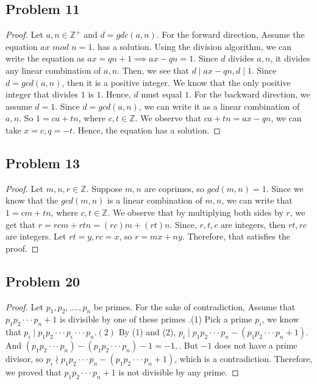 \documentclass[a4paper,12pt]{article}
\begin{document}
\subsection*{Problem 11}
\begin{proof}
Let $a,n \in \mathbb{Z^+}$ and $d=gdc(a,n).$ For the forward direction, Assume the equation $ax$ $mod$ $n=1.$ has a solution. Using the division algorithm, we can write the equation as $ax=qn+1 \implies ax-qn=1.$ Since $d$ divides $a,n$, it divides any linear combination of $a,n$. Then, we see that $d\mid ax-qn, d\mid1$. Since $d=gcd(a,n)$, then it is a positive integer. We know that the only positive integer that divides $1$ is $1$. Hence, $d$ must equal $1$. For the backward direction, we assume $d=1$. Since $d=gcd(a,n)$, we can write it as a linear combination of $a,n$. So $1=ca+tn$, where $c,t\in \mathbb{Z}.$ We observe that $ca+tn=ax-qn$, we can take $x=c, q=-t.$ Hence, the equation has a solution.    
\end{proof}
\subsection*{Problem 13}
\begin{proof}
    Let $m,n,r \in \mathbb{Z}$. Suppose $m,n$ are coprimes, so $gcd(m,n)=1$. Since we know that the $gcd(m,n)$ is a linear combination of $m,n$, we can write that $1=cm+tn$, where $c,t \in \mathbb{Z}.$ We observe that by multiplying both sides by $r$, we get that $r=rcm+rtn=(rc)m+(rt)n$.
Since, $r,t,c$ are integers, then $rt, rc$ are integers. Let $rt=y, rc=x$, so $r=mx+ny.$ Therefore, that satisfies the proof.
\end{proof}
\subsection*{Problem 20}
\begin{proof}
    Let $p_1,p_2,....,p_n$ be primes. For the sake of contradiction, Assume that $p_1p_2\cdot \cdot \cdot p_n+1$ is divisible by one of these primes .(1) Pick a prime $p_i$, we know that $p_i\mid p_1p_2\cdot \cdot \cdot p_i \cdot \cdot \cdot p_n .(2) $ By (1) and (2), $p_i\mid p_1p_2\cdot \cdot \cdot p_n-(p_1p_2\cdot \cdot \cdot p_n+1)$. And $(p_1p_2\cdot \cdot \cdot p_n)-(p_1p_2\cdot \cdot \cdot p_n)-1=-1,$. But $-1$ does not have a prime divisor, so $p_i\nmid p_1p_2\cdot \cdot \cdot p_n-(p_1p_2\cdot \cdot \cdot p_n+1)$, which is a contradiction. Therefore, we proved that $p_1p_2\cdot \cdot \cdot p_n+1$ is not divisible by any prime.
\end{proof}
\end{document}
